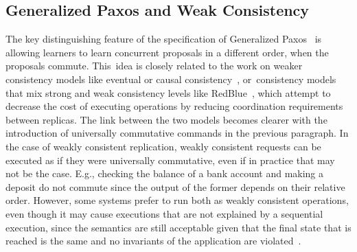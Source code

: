 \documentclass[algorithms,article,accept,moreauthors,pdftex,10pt,a4paper]{Definitions/mdpi}
\begin{document}
\subsection{Generalized Paxos and Weak Consistency}
The key distinguishing feature of the specification of Generalized
Paxos~\cite{Lamport2005} is allowing learners to learn concurrent
proposals in a different order, when the proposals commute. This~idea
is closely related to the work on weaker consistency models like eventual or
causal consistency~\cite{Ahamad1995}, or~consistency models that mix
strong and weak consistency levels like RedBlue~\cite{Li2012}, which attempt
to decrease the cost of executing operations by reducing coordination
requirements between replicas. 
The link between the two models becomes clearer with the introduction of 
universally commutative commands in the previous paragraph.
In the case of weakly consistent replication,
weakly consistent requests can be executed as if they were universally
commutative, even if in practice that may not be the case. E.g., checking 
the balance of a bank account and making a deposit do not commute since
the output of the former depends on their relative order. However,
some systems prefer to run both as weakly consistent operations, even
though it may cause executions that are not explained by a sequential
execution, since the semantics are still acceptable given
that the final state that is reached is the same and no invariants 
of the application are violated~\cite{Li2012}.



\end{document}
